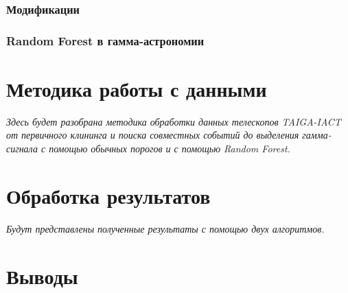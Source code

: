 \documentclass[magd,floatypics,numeref]{msudipl} %
\begin{document}
\subsection{Модификации}
\subsection{Random Forest в гамма-астрономии}

\chapter{Методика работы с данными}
\textit{Здесь будет разобрана методика обработки данных телескопов TAIGA-IACT от первичного клининга и поиска совместных событий до выделения гамма-сигнала с помощью обычных порогов и с помощью Random Forest.}
\chapter{Обработка результатов}
\textit{Будут представлены полученные результаты с помощью двух алгоритмов. }
\chapter*{Выводы}   %


{}  %
\end{document}
